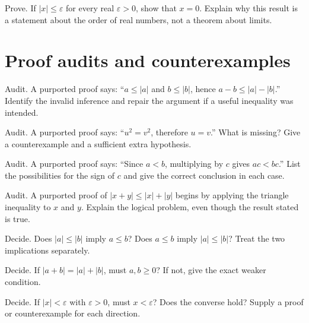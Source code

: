 \documentclass{workbook}
\begin{document}
\begin{problem}{Prove.}
If $|x|\leq\varepsilon$ for every real $\varepsilon>0$, show that $x=0$.
Explain why this result is a statement about the order of real numbers,
not a theorem about limits.
\end{problem}

\section{Proof audits and counterexamples}

\begin{problem}{Audit.}
A purported proof says: ``$a\leq|a|$ and $b\leq|b|$, hence
$a-b\leq|a|-|b|$.'' Identify the invalid inference and repair the
argument if a useful inequality was intended.
\end{problem}

\begin{problem}{Audit.}
A purported proof says: ``$u^2=v^2$, therefore $u=v$.''
What is missing? Give a counterexample and a sufficient extra hypothesis.
\end{problem}

\begin{problem}{Audit.}
A purported proof says: ``Since $a<b$, multiplying by $c$ gives
$ac<bc$.'' List the possibilities for the sign of $c$ and give the
correct conclusion in each case.
\end{problem}

\begin{problem}{Audit.}
A purported proof of $|x+y|\leq|x|+|y|$ begins by applying the triangle
inequality to $x$ and $y$. Explain the logical problem, even though the
result stated is true.
\end{problem}

\begin{problem}{Decide.}
Does $|a|\leq|b|$ imply $a\leq b$? Does $a\leq b$ imply $|a|\leq|b|$?
Treat the two implications separately.
\end{problem}

\begin{problem}{Decide.}
If $|a+b|=|a|+|b|$, must $a,b\geq0$?
If not, give the exact weaker condition.
\end{problem}

\begin{problem}{Decide.}
If $|x|<\varepsilon$ with $\varepsilon>0$, must $x<\varepsilon$?
Does the converse hold? Supply a proof or counterexample for each direction.
\end{problem}
\end{document}
